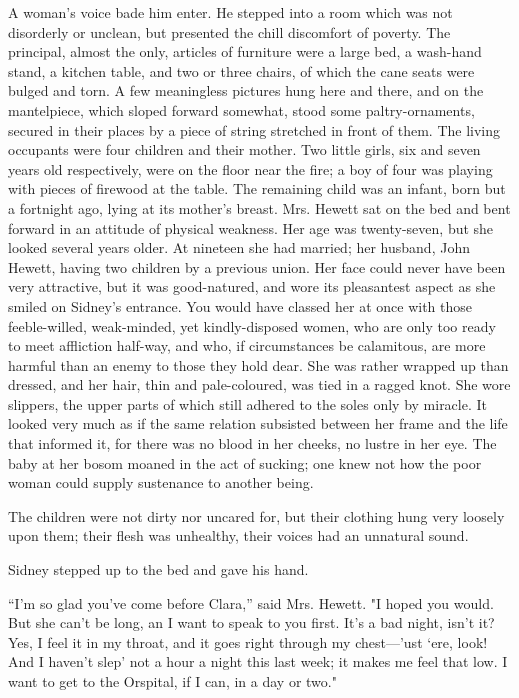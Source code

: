 A woman's voice bade him enter. He stepped into a room which was not
disorderly or unclean, but presented the chill discomfort of poverty.
The principal, almost the only, articles of furniture were a large bed,
a {\protect\hypertarget{36}{}{}}wash-hand stand, a kitchen table, and
two or three chairs, of which the cane seats were bulged and torn. A few
meaningless pictures hung here and there, and on the mantelpiece, which
sloped forward somewhat, stood some paltry-ornaments, secured in their
places by a piece of string stretched in front of them. The living
occupants were four children and their mother. Two little girls, six and
seven years old respectively, were on the floor near the fire; a boy of
four was playing with pieces of firewood at the table. The remaining
child was an infant, born but a fortnight ago, lying at its mother's
breast. Mrs. Hewett sat on the bed and bent forward in an attitude of
physical weakness. Her age was twenty-seven, but she looked several
years older. At nineteen she had married; her husband, John Hewett,
having two children by a previous union. Her face could never have been
very attractive, but it was good-natured, and wore its pleasantest
aspect as she smiled on Sidney's entrance. You would have classed her at
once with those {\protect\hypertarget{37}{}{}}feeble-willed,
weak-minded, yet kindly-disposed women, who are only too ready to meet
affliction half-way, and who, if circumstances be calamitous, are more
harmful than an enemy to those they hold dear. She was rather wrapped up
than dressed, and her hair, thin and pale-coloured, was tied in a ragged
knot. She wore slippers, the upper parts of which still adhered to the
soles only by miracle. It looked very much as if the same relation
subsisted between her frame and the life that informed it, for there was
no blood in her cheeks, no lustre in her eye. The baby at her bosom
moaned in the act of sucking; one knew not how the poor woman could
supply sustenance to another being.

The children were not dirty nor uncared for, but their clothing hung
very loosely upon them; their flesh was unhealthy, their voices had an
unnatural sound.

Sidney stepped up to the bed and gave his hand.

``I'm so glad you've come before Clara,'' said Mrs. Hewett. "I hoped you
would. {\protect\hypertarget{38}{}{}}But she can't be long, an I want to
speak to you first. It's a bad night, isn't it? Yes, I feel it in my
throat, and it goes right through my chest---'ust `ere, look! And I
haven't slep' not a hour a night this last week; it makes me feel that
low. I want to get to the Orspital, if I can, in a day or two."

